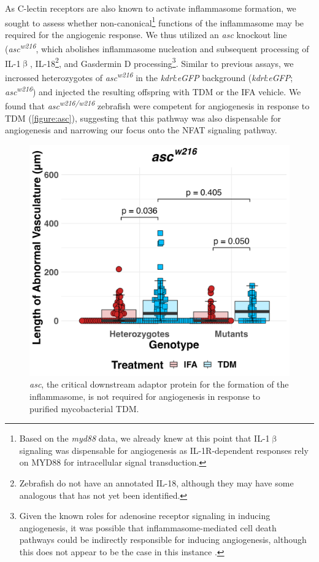 As C\hyp{}lectin receptors are also known to activate inflammasome formation, we sought to assess whether non\hyp{}canonical\footnote{Based on the \textit{myd88} data, we already knew at this point that IL-1$\upbeta$ signaling was dispensable for angiogenesis as IL-1R-dependent responses rely on MYD88 for intracellular signal transduction.} functions of the inflammasome may be required for the angiogenic response. We thus utilized an \textit{asc} knockout line (\textit{asc\textsuperscript{w216}}, which abolishes inflammasome nucleation and subsequent processing of IL-1$\upbeta$, IL-18\footnote{Zebrafish do not have an annotated IL-18, although they may have some analogous that has not yet been identified.}, and Gasdermin D processing\footnote{Given the known roles for adenosine receptor signaling in inducing angiogenesis, it was possible that inflammasome-mediated cell death pathways could be indirectly responsible for inducing angiogenesis, although this does not appear to be the case in this instance \citep{Clark2007, Montesinos2002, Dusseau1986, Auchampach2007}.}. Similar to previous assays, we incrossed heterozygotes of \textit{asc\textsuperscript{w216}} in the \textit{kdrl}:\textit{eGFP} background (\textit{kdrl}:\textit{eGFP}; \textit{asc\textsuperscript{w216}}) and injected the resulting offspring with TDM or the IFA vehicle. We found that \textit{asc\textsuperscript{w216/w216}} zebrafish were competent for angiogenesis in response to TDM (\autoref{figure:asc}), suggesting that this pathway was also dispensable for angiogenesis and narrowing our focus onto the NFAT signaling pathway.

\begin{figure}
\centering
\includegraphics[width=\textwidth]{images/asc_tdm_110922.png}
\caption{\textit{asc}, the critical downstream adaptor protein for the formation of the inflammasome, is not required for angiogenesis in response to purified mycobacterial TDM.}
\label{figure:asc}
\end{figure}

